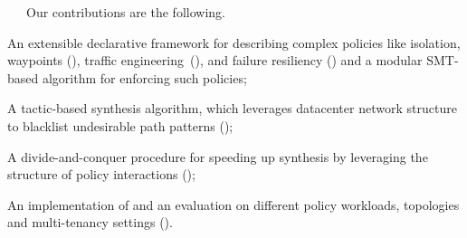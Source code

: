  \ \ \ Our contributions are the following.
\begin{compactitemize}
\item An extensible declarative framework for describing
  complex policies like isolation, waypoints (), traffic engineering~(), and 
  failure resiliency () and a modular SMT-based algorithm for enforcing such policies;
\item A tactic-based synthesis algorithm, which leverages datacenter network structure
  to blacklist undesirable path patterns ();
\item A divide-and-conquer procedure for speeding up synthesis by leveraging the 
structure of policy interactions ();
\item An implementation of \Name and an  evaluation on
  different policy workloads, topologies and multi-tenancy
  settings ().
\end{compactitemize}

